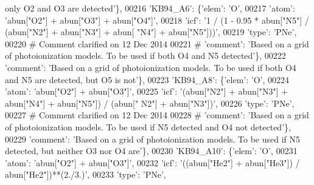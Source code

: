 \begin{DoxyCode}
{       only O2 and O3 are detected'}\},
00216                          \textcolor{stringliteral}{'KB94\_A6'}: \{\textcolor{stringliteral}{'elem'}: \textcolor{stringliteral}{'O'},
00217                                      \textcolor{stringliteral}{'atom'}: \textcolor{stringliteral}{'abun["O2"] + abun["O3"] + abun["O4"]'},
00218                                       \textcolor{stringliteral}{'icf'}: \textcolor{stringliteral}{'1 / (1 - 0.95 * abun["N5"] / (abun["N2"] + abun["N3"] + abun[
      "N4"] + abun["N5"]))'},
00219                                       \textcolor{stringliteral}{'type'}: \textcolor{stringliteral}{'PNe'},
00220 \textcolor{comment}{# Comment clarified on 12 Dec 2014 }
00221 \textcolor{comment}{#                                      'comment': 'Based on a grid of photoionization models. To be used if
       both O4 and N5 detected'\},}
00222                                       \textcolor{stringliteral}{'comment'}: \textcolor{stringliteral}{'Based on a grid of photoionization models. To be used if
       both O4 and N5 are detected, but O5 is not'}\},
00223                          \textcolor{stringliteral}{'KB94\_A8'}: \{\textcolor{stringliteral}{'elem'}: \textcolor{stringliteral}{'O'},
00224                                      \textcolor{stringliteral}{'atom'}: \textcolor{stringliteral}{'abun["O2"] + abun["O3"]'},
00225                                      \textcolor{stringliteral}{'icf'}: \textcolor{stringliteral}{'(abun["N2"] + abun["N3"] + abun["N4"] + abun["N5"]) / (abun["
      N2"] + abun["N3"])'},
00226                                      \textcolor{stringliteral}{'type'}: \textcolor{stringliteral}{'PNe'},
00227 \textcolor{comment}{# Comment clarified on 12 Dec 2014 }
00228 \textcolor{comment}{#                                     'comment': 'Based on a grid of photoionization models. To be used if
       N5 detected and O4 not detected'\},}
00229                                      \textcolor{stringliteral}{'comment'}: \textcolor{stringliteral}{'Based on a grid of photoionization models. To be used if
       N5 detected, but neither O3 nor O4 are'}\},
00230                          \textcolor{stringliteral}{'KB94\_A10'}: \{\textcolor{stringliteral}{'elem'}: \textcolor{stringliteral}{'O'},
00231                                       \textcolor{stringliteral}{'atom'}: \textcolor{stringliteral}{'abun["O2"] + abun["O3"]'},
00232                                       \textcolor{stringliteral}{'icf'}: \textcolor{stringliteral}{'((abun["He2"] + abun["He3"]) / abun["He2"])**(2./3.)'},
00233                                       \textcolor{stringliteral}{'type'}: \textcolor{stringliteral}{'PNe'},

\end{DoxyCode}
